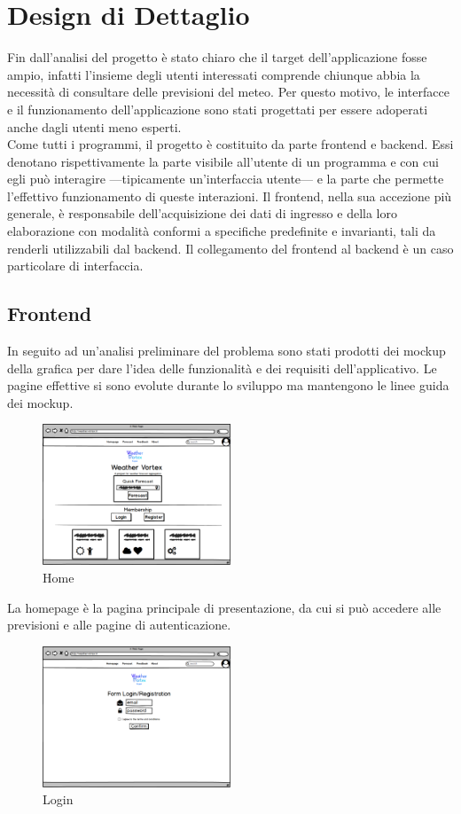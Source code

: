 \chapter{Design di Dettaglio}
Fin dall'analisi del progetto è stato chiaro che il target dell'applicazione fosse
ampio, infatti l'insieme degli utenti interessati comprende chiunque abbia la
necessità di consultare delle previsioni del meteo.
Per questo motivo, le interfacce e il funzionamento dell'applicazione sono
stati progettati per essere adoperati anche dagli utenti meno esperti.\\

Come tutti i programmi, il progetto è costituito da parte frontend e backend.
Essi denotano rispettivamente la parte visibile all'utente di un programma e con cui egli può interagire —tipicamente un'interfaccia utente— e la parte che permette l'effettivo funzionamento di queste interazioni. Il frontend, nella sua accezione più generale, è responsabile dell'acquisizione dei dati di ingresso e della loro elaborazione con modalità conformi a specifiche predefinite e invarianti, tali da renderli utilizzabili dal backend. Il collegamento del frontend al backend è un caso particolare di interfaccia.
\section{Frontend}
In seguito ad un'analisi preliminare del problema sono stati prodotti dei mockup
della grafica per dare l'idea delle funzionalità e dei requisiti dell'applicativo. Le
pagine effettive si sono evolute durante lo sviluppo ma mantengono le linee guida
dei mockup.

\begin{figure}[H]
    \caption{Home}
    \label{fig:Home}
    \centering
    \includegraphics[width=0.5\textwidth]{MockUps/homepage.png}
\end{figure}
La homepage è la pagina principale di presentazione, da cui si può accedere alle previsioni e alle pagine di autenticazione.
\begin{figure}[H]
    \caption{Login}
    \label{fig:Home}
    \centering
    \includegraphics[width=0.5\textwidth]{MockUps/Login_Register.png}
\end{figure}

